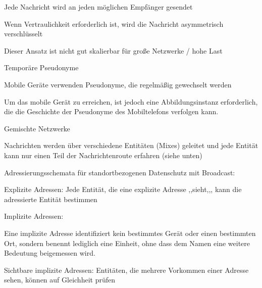 \documentclass[a4paper]{article}
\begin{document}
\begin{multicols}{3}
\begin{itemize*}
\begin{itemize*}
                  \begin{itemize*}
                        \item Jede Nachricht wird an jeden möglichen Empfänger gesendet
                        \item Wenn Vertraulichkeit erforderlich ist, wird die Nachricht asymmetrisch verschlüsselt
                        \item Dieser Ansatz ist nicht gut skalierbar für große Netzwerke / hohe Last
                  \end{itemize*}
                  \item Temporäre Pseudonyme
                  \begin{itemize*}
                        \item Mobile Geräte verwenden Pseudonyme, die regelmäßig gewechselt werden
                        \item Um das mobile Gerät zu erreichen, ist jedoch eine Abbildungsinstanz erforderlich, die die Geschichte der Pseudonyme des Mobiltelefons verfolgen kann.
                  \end{itemize*}
                  \item Gemischte Netzwerke
                  \begin{itemize*}
                        \item Nachrichten werden über verschiedene Entitäten (Mixes) geleitet und jede Entität kann nur einen Teil der Nachrichtenroute erfahren (siehe unten)
                  \end{itemize*}
            \end{itemize*}
            \item Adressierungsschemata für standortbezogenen Datenschutz mit Broadcast:
            \begin{itemize*}
                  \item Explizite Adressen: Jede Entität, die eine explizite Adresse ,,sieht,,, kann die adressierte Entität bestimmen
            \end{itemize*}
            \item Implizite Adressen:
            \begin{itemize*}
                  \item Eine implizite Adresse identifiziert kein bestimmtes Gerät oder einen bestimmten Ort, sondern benennt lediglich eine Einheit, ohne dass dem Namen eine weitere Bedeutung beigemessen wird.
                  \item Sichtbare implizite Adressen: Entitäten, die mehrere Vorkommen einer Adresse sehen, können auf Gleichheit prüfen

\end{itemize*}
\end{itemize*}
\end{multicols}
\end{document}
